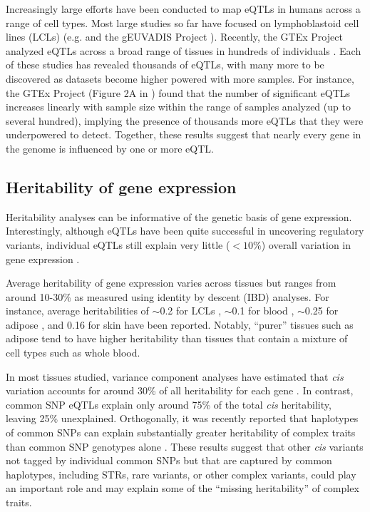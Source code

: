 Increasingly large efforts have been conducted to map eQTLs in humans across a range of cell types. Most large studies so far have focused on lymphoblastoid cell lines (LCLs) (e.g. \cite{GaffneyVeyrierasDegnerEtAl2012} and the gEUVADIS Project \cite{LappalainenSammethFriedlanderEtAl2013}). Recently, the GTEx Project analyzed eQTLs across a broad range of tissues in hundreds of individuals \cite{ArdlieDelucaSegreEtAl2015}. Each of these studies has revealed thousands of eQTLs, with many more to be discovered as datasets become higher powered with more samples. For instance, the GTEx Project (Figure 2A in \cite{ArdlieDelucaSegreEtAl2015}) found that the number of significant eQTLs increases linearly with sample size within the range of samples analyzed (up to several hundred), implying the presence of thousands more eQTLs that they were underpowered to detect. Together, these results suggest that nearly every gene in the genome is influenced by one or more eQTL.

\subsection{Heritability of gene expression}
Heritability analyses can be informative of the genetic basis of gene expression. Interestingly, although eQTLs have been quite successful in uncovering regulatory variants, individual eQTLs still explain very little ($< 10\%$) overall variation in gene expression \cite{GrundbergSmallHedmanEtAl2012}. 

Average heritability of gene expression varies across tissues but ranges from around 10-30\% as measured using identity by descent (IBD) analyses. For instance, average heritabilities of $\sim$0.2 for LCLs \cite{GrundbergSmallHedmanEtAl2012,DixonLiangMoffattEtAl2007}, $\sim$0.1 for blood \cite{PriceHelgasonThorleifssonEtAl2011,WrightSullivanBrooksEtAl2014}, $\sim$0.25 for adipose \cite{PriceHelgasonThorleifssonEtAl2011,GrundbergSmallHedmanEtAl2012}, and 0.16 for skin \cite{GrundbergSmallHedmanEtAl2012} have been reported. Notably, ``purer'' tissues such as adipose tend to have higher heritability than tissues that contain a mixture of cell types such as whole blood.

In most tissues studied, variance component analyses have estimated that \emph{cis} variation accounts for around 30\% of all heritability for each gene \cite{GrundbergSmallHedmanEtAl2012,PriceHelgasonThorleifssonEtAl2011}. In contrast, common SNP eQTLs explain only around 75\% of the total \emph{cis} heritability, leaving 25\% unexplained.  Orthogonally, it was recently reported that haplotypes of common SNPs can explain substantially greater heritability of complex traits than common SNP genotypes alone \cite{BhatiaGusevLohEtAl2015}. These results suggest that other \emph{cis} variants not tagged by individual common SNPs but that are captured by common haplotypes, including STRs, rare variants, or other complex variants, could play an important role and may explain some of the ``missing heritability'' of complex traits. 

